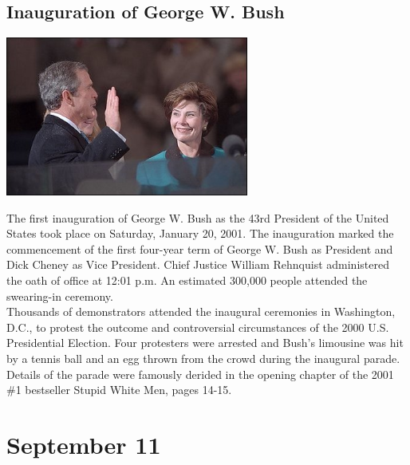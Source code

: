 \documentclass[11pt]{report}
\begin{document}
\subsection{Inauguration of George W. Bush}
\vspace{2mm}\begin{center}\includegraphics[width=8cm]{./img/inaugGWBush.jpg}\end{center}
The first inauguration of George W. Bush as the 43rd President of the United States took place on Saturday, January 20, 2001. The inauguration marked the commencement of the first four-year term of George W. Bush as President and Dick Cheney as Vice President. Chief Justice William Rehnquist administered the oath of office at 12:01 p.m. An estimated 300,000 people attended the swearing-in ceremony.\\
\indent Thousands of demonstrators attended the inaugural ceremonies in Washington, D.C., to protest the outcome and controversial circumstances of the 2000 U.S. Presidential Election. Four protesters were arrested and Bush's limousine was hit by a tennis ball and an egg thrown from the crowd during the inaugural parade. Details of the parade were famously derided in the opening chapter of the 2001 \#1 bestseller Stupid White Men, pages 14-15.
\section{September 11}
\end{document}
